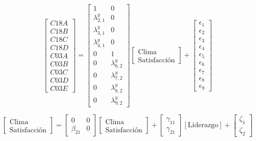 \documentclass[11pt, a4paper]{article} %
\begin{document}
\begin{equation}
\begin{bmatrix} C18A \\ C18B \\ C18C \\ C18D \\ C03A \\ C03B \\ C03C \\ C03D \\ C03E \end{bmatrix} = \begin{bmatrix} 1 & 0 \\ \lambda^y_{2,1} & 0 \\ \lambda^y_{3,1} & 0 \\ \lambda^y_{4,1} & 0 \\ 0 & 1 \\ 0 & \lambda^y_{6,2} \\ 0 & \lambda^y_{7,2} \\ 0 & \lambda^y_{8,2} \\ 0 & \lambda^y_{9,2} \end{bmatrix} \begin{bmatrix} \text{Clima} \\ \text{Satisfacción} \end{bmatrix} + \begin{bmatrix} \epsilon_1 \\ \epsilon_2 \\ \epsilon_3 \\ \epsilon_4 \\ \epsilon_5 \\ \epsilon_6 \\ \epsilon_7 \\ \epsilon_8 \\ \epsilon_9 \end{bmatrix}
\end{equation}

\begin{equation}
\begin{bmatrix} \text{Clima} \\ \text{Satisfacción} \end{bmatrix} = \begin{bmatrix} 0 & 0 \\ \beta_{21} & 0 \end{bmatrix} \begin{bmatrix} \text{Clima} \\ \text{Satisfacción} \end{bmatrix} + \begin{bmatrix} \gamma_{11} \\ \gamma_{21} \end{bmatrix} [\text{Liderazgo}] + \begin{bmatrix} \zeta_1 \\ \zeta_2 \end{bmatrix}
\end{equation}
\end{document}
